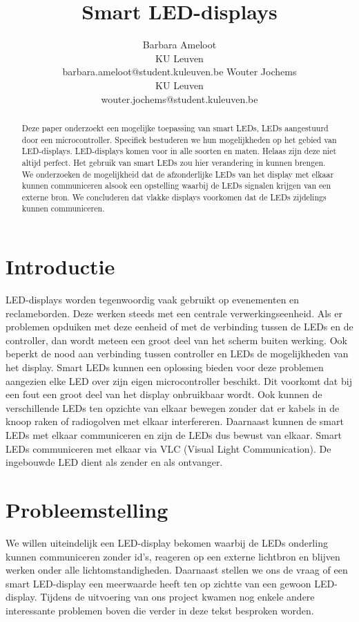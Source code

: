 \documentclass{article}
\title{Smart LED-displays}
\author{Barbara Ameloot\\
KU Leuven\\
barbara.ameloot@student.kuleuven.be
\And 
Wouter Jochems\\
KU Leuven\\
wouter.jochems@student.kuleuven.be}
\begin{document}
\maketitle

\begin{abstract}
  Deze paper onderzoekt een mogelijke toepassing van smart LEDs, LEDs aangestuurd door een microcontroller. Specifiek bestuderen we hun mogelijkheden op het gebied van LED-displays. LED-displays komen voor in alle soorten en maten. Helaas zijn deze niet altijd perfect. Het gebruik van smart LEDs zou hier verandering in kunnen brengen. We onderzoeken de mogelijkheid dat de afzonderlijke LEDs van het display met elkaar kunnen communiceren alsook een opstelling waarbij de LEDs signalen krijgen van een externe bron. We concluderen dat vlakke displays voorkomen dat de LEDs zijdelings kunnen communiceren.
\end{abstract}


\section{Introductie}

LED-displays worden tegenwoordig vaak gebruikt op evenementen en reclameborden. Deze werken steeds met een centrale verwerkingseenheid. Als er problemen opduiken met deze eenheid of met de verbinding tussen de LEDs en de controller, dan wordt meteen een groot deel van het scherm buiten werking. Ook beperkt de nood aan verbinding tussen controller en LEDs de mogelijkheden van het display.
Smart LEDs kunnen een oplossing bieden voor deze problemen aangezien elke LED over zijn eigen microcontroller beschikt. Dit voorkomt dat bij een fout een groot deel van het display onbruikbaar wordt. Ook kunnen de verschillende LEDs ten opzichte van elkaar bewegen zonder dat er kabels in de knoop raken of radiogolven met elkaar interfereren. Daarnaast kunnen de smart LEDs met elkaar communiceren en zijn de LEDs dus bewust van elkaar.
Smart LEDs communiceren met elkaar via VLC (Visual Light Communication). De ingebouwde LED dient als zender en als ontvanger.


\section{Probleemstelling}

We willen uiteindelijk een LED-display bekomen waarbij de LEDs onderling kunnen communiceren zonder id’s, reageren op een externe lichtbron en blijven werken onder alle lichtomstandigheden. Daarnaast stellen we ons de vraag of een smart LED-display een meerwaarde heeft ten op zichtte van een gewoon LED-display. Tijdens de uitvoering van ons project kwamen nog enkele andere interessante problemen boven die verder in deze tekst besproken worden.
\end{document}
